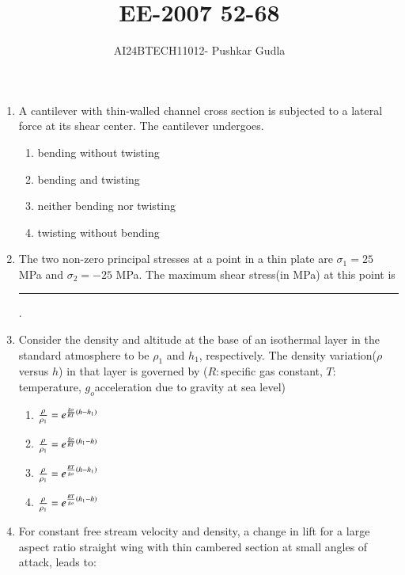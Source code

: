 \documentclass[journal,12pt,onecolumn]{IEEEtran}
\theoremstyle{remark}
\begin{document}

\vspace{3cm}

\title{\textbf{EE-2007 52-68}}
\author{AI24BTECH11012- Pushkar Gudla}
\maketitle
\bigskip

\renewcommand{\thefigure}{\theenumi}
\renewcommand{\thetable}{\theenumi}
\setlength{\columnsep}{2.5em}

\begin{enumerate}
    \item A cantilever with thin-walled channel cross section is subjected to a lateral force at its shear center. The cantilever undergoes.
    \begin{enumerate}
    \item bending without twisting
    \item bending and twisting
    \item neither bending nor twisting
    \item twisting without bending
    \end{enumerate}
  \item The two non-zero principal stresses at a point in a thin plate are $\sigma_1=25$ MPa and $\sigma_2=-25$ MPa. The maximum shear stress(in MPa) at this point is \rule{2.5cm}{0.4pt}.
  \item Consider the density and altitude at the base of an isothermal layer in the standard atmosphere to be $\rho_1$ and $h_1$, respectively. The density variation($\rho$ versus $h$) in that layer is governed by ($R:$specific gas constant, $T:$temperature, $g_o$acceleration due to gravity at sea level)
    \begin{enumerate}
    \item $\frac{\rho}{\rho_1}=e^{\frac{g_o}{RT}\left(h-h_1\right)}$
    \item $\frac{\rho}{\rho_1}=e^{\frac{g_o}{RT}\left(h_1-h\right)}$
    \item $\frac{\rho}{\rho_1}=e^{\frac{RT}{g_o}\left(h-h_1\right)}$
    \item $\frac{\rho}{\rho_1}=e^{\frac{RT}{g_o}\left(h_1-h\right)}$
    \end{enumerate}
  \item For constant free stream velocity and density, a change in lift for a large aspect ratio straight wing with thin cambered section at small angles of attack, leads to:
  \begin{enumerate}

\end{enumerate}
\end{enumerate}
\end{document}
